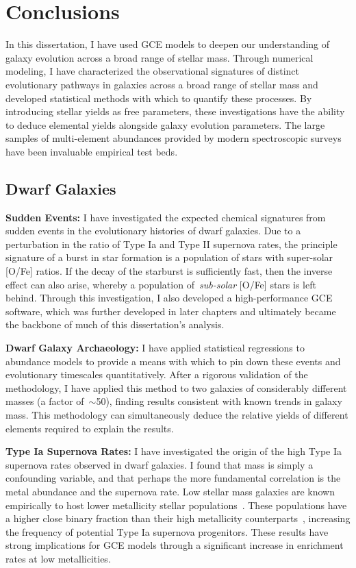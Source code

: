 \documentclass[main.tex]{subfiles}
\begin{document}
\chapter{Conclusions}
\label{conclusions}

In this dissertation, I have used GCE models to deepen our understanding of
galaxy evolution across a broad range of stellar mass.
Through numerical modeling, I have characterized the observational
signatures of distinct evolutionary pathways in galaxies across a broad range
of stellar mass and developed statistical methods with which to quantify these
processes.
By introducing stellar yields as free parameters, these investigations have
the ability to deduce elemental yields alongside galaxy evolution parameters.
The large samples of multi-element abundances provided by modern spectroscopic
surveys have been invaluable empirical test beds.

\section{Dwarf Galaxies}
\label{conclusions:sec:dwarfs}
\textbf{Sudden Events:} I have investigated the expected chemical signatures
from sudden events in the evolutionary histories of dwarf galaxies.
Due to a perturbation in the ratio of Type Ia and Type II supernova rates,
the principle signature of a burst in star formation is a population of
stars with super-solar [O/Fe] ratios.
If the decay of the starburst is sufficiently fast, then the inverse effect can
also arise, whereby a population of~\textit{sub-solar} [O/Fe] stars is left
behind.
Through this investigation, I also developed a high-performance GCE software,
which was further developed in later chapters and ultimately became the
backbone of much of this dissertation's analysis.
\par
\textbf{Dwarf Galaxy Archaeology:} I have applied statistical regressions to
abundance models to provide a means with which to pin down these events and
evolutionary timescales quantitatively.
After a rigorous validation of the methodology, I have applied this method to
two galaxies of considerably different masses (a factor of~$\sim$50), finding
results consistent with known trends in galaxy mass.
This methodology can simultaneously deduce the relative yields of different
elements required to explain the results.
\par
\textbf{Type Ia Supernova Rates:} I have investigated the origin of the high
Type Ia supernova rates observed in dwarf galaxies.
I found that mass is simply a confounding variable, and that perhaps the more
fundamental correlation is the metal abundance and the supernova rate.
Low stellar mass galaxies are known empirically to host lower metallicity
stellar populations~\citep[e.g.,][]{Gallazzi2005, Kirby2013}.
These populations have a higher close binary fraction than their high
metallicity counterparts~\citep[e.g.,][]{Badenes2018, Moe2019}, increasing the
frequency of potential Type Ia supernova progenitors.
These results have strong implications for GCE models through a significant
increase in enrichment rates at low metallicities.
\end{document}
